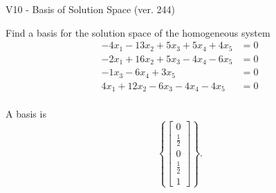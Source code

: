 \begin{exercise}
  \begin{exerciseTitle}V10 - Basis of Solution Space (ver. 244)\end{exerciseTitle}
  \begin{exerciseStatement}
    Find a basis for the solution space of the homogeneous system 
\begin{align*}
 -4 x_ 1 -13 x_ 2 + 5 x_ 3 + 5 x_ 4 + 4 x_ 5 &= 0  \\ 
  -2 x_ 1 + 16 x_ 2 + 5 x_ 3 -4 x_ 4 -6 x_ 5 &= 0  \\ 
  -1 x_ 3 -6 x_ 4 + 3 x_ 5 &= 0  \\ 
  4 x_ 1 + 12 x_ 2 -6 x_ 3 -4 x_ 4 -4 x_ 5 &= 0  \\ 
 \end{align*}


 
  \end{exerciseStatement}

  \begin{exerciseAnswer}
   A basis is   
\[\left\{\left[\begin{array}{c}
0 \\
\frac{1}{2} \\
0 \\
\frac{1}{2} \\
1
\end{array}\right]\right\}.\]

  


  \end{exerciseAnswer}
\end{exercise}